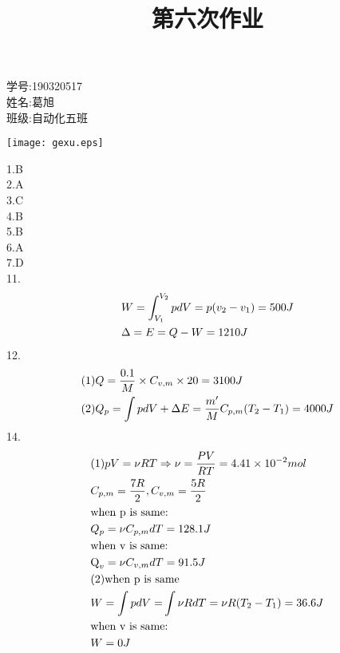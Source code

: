 \documentclass{article}
\begin{document}
\title{第六次作业}
\maketitle
\begin{minipage}[b]{0.5\linewidth}
学号:190320517\\
姓名:葛旭\\
班级:自动化五班\\
\end{minipage}
\hfill
\begin{minipage}[b]{0.5\linewidth}
\texttt{[image: gexu.eps]}\\
\end{minipage}
1.B\\
2.A\\
3.C\\
4.B\\
5.B\\
6.A\\
7.D\\
11.\[\begin{gathered}
W = \int_{{V_1}}^{{V_2}} {pdV = p({v_2} - {v_1})}  = 500J \hfill \\
\Delta  = E = Q - W = 1210J \hfill \\ 
\end{gathered} \]
12.\[\begin{gathered}
(1)Q = \frac{{0.1}}{M} \times {C_{v,m}} \times 20 = 3100J \hfill \\
(2){Q_p} = \int {pdV + \Delta E = \frac{{m'}}{M}{C_{p,m}}({T_2} - {T_1}) = 4000J}  \hfill \\ 
\end{gathered} \]
14.\[\begin{gathered}
(1)pV = \nu RT \Rightarrow \nu  = \frac{{PV}}{{RT}} = 4.41 \times {10^{ - 2}}mol \hfill \\
{C_{p,m}} = \frac{{7R}}{2},{C_{v,m}} = \frac{{5R}}{2} \hfill \\
{\text{when p is same:}} \hfill \\
{Q_p} = \nu {C_{p,m}}dT = 128.1J \hfill \\
{\text{when v is same:}} \hfill \\
{{\text{Q}}_v} = \nu {C_{v,m}}dT = 91.5J \hfill \\
(2){\text{when p is same}} \hfill \\
W = \int {pdV = } \int {\nu RdT = \nu R({T_2} - {T_1}) = 36.6J}  \hfill \\
{\text{when v is same:}} \hfill \\
W = 0J \hfill \\ 
\end{gathered} \]
\end{document}
